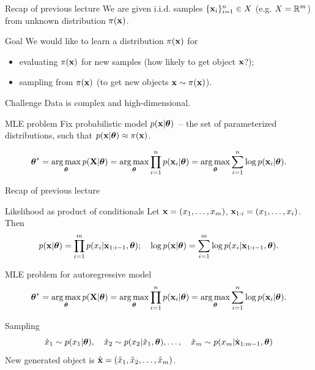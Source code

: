 

\begin{frame}
\titlepage
\end{frame}
\begin{frame}{Recap of previous lecture}
	We are given i.i.d. samples $\{\mathbf{x}_i\}_{i=1}^n \in X$ (e.g. $X = \mathbb{R}^m$) from unknown distribution $\pi(\mathbf{x})$.
	\begin{block}{Goal}
		We would like to learn a distribution $\pi(\mathbf{x})$ for 
		\begin{itemize}
			\item evaluating $\pi(\mathbf{x})$ for new samples (how likely to get object $\mathbf{x}$?);
			\item sampling from $\pi(\mathbf{x})$ (to get new objects $\mathbf{x} \sim \pi(\mathbf{x})$).
		\end{itemize}
	\end{block}
	\begin{block}{Challenge}
		Data is complex and high-dimensional.
	\end{block}
	\begin{block}{MLE problem}
	Fix probabilistic model $p(\mathbf{x} | \boldsymbol{\theta})$~-- the set of parameterized distributions, such that $p(\mathbf{x} | \boldsymbol{\theta}) \approx \pi(\mathbf{x})$.
	
		\vspace{-0.3cm}
		\[
		\boldsymbol{\theta}^* = \operatorname*{arg\,max}_{\boldsymbol{\theta}} p(\mathbf{X} | \boldsymbol{\theta}) = \operatorname*{arg\,max}_{\boldsymbol{\theta}} \prod_{i=1}^n p(\mathbf{x}_i | \boldsymbol{\theta}) = \operatorname*{arg\,max}_{\boldsymbol{\theta}} \sum_{i=1}^n \log p(\mathbf{x}_i | \boldsymbol{\theta}).
		\]
		\vspace{-0.1cm}
	\end{block}
\end{frame}
\begin{frame}{Recap of previous lecture}
	\begin{block}{Likelihood as product of conditionals}
		Let $\mathbf{x} = (x_1, \dots, x_m)$, $\mathbf{x}_{1:i} = (x_1, \dots, x_i)$. Then 
		\[
		p(\mathbf{x} | \boldsymbol{\theta}) = \prod_{i=1}^m p(x_i | \mathbf{x}_{1:i - 1}, \boldsymbol{\theta}); \quad 
		\log p(\mathbf{x} | \boldsymbol{\theta}) = \sum_{i=1}^m \log p(x_i | \mathbf{x}_{1:i - 1}, \boldsymbol{\theta}).
		\]
	\end{block}
	\vspace{-0.3cm}
	\begin{block}{MLE problem for autoregressive model}
		\vspace{-0.5cm}
		\[
		\boldsymbol{\theta}^* = \operatorname*{arg\,max}_{\boldsymbol{\theta}} p(\mathbf{X} | \boldsymbol{\theta}) = \operatorname*{arg\,max}_{\boldsymbol{\theta}} \prod_{i=1}^n p(\mathbf{x}_i | \boldsymbol{\theta}) = \operatorname*{arg\,max}_{\boldsymbol{\theta}} \sum_{i=1}^n \log p(\mathbf{x}_i | \boldsymbol{\theta}).
		\]
		\vspace{-0.5cm}
	\end{block}
	\begin{block}{Sampling}
		\vspace{-0.5cm}
		\[
			\hat{x}_1 \sim p(x_1 | \boldsymbol{\theta}), \quad \hat{x}_2 \sim p(x_2 | \hat{x}_1, \boldsymbol{\theta}), \dots, \quad \hat{x}_m \sim p(x_m | \hat{\mathbf{x}}_{1:m-1}, \boldsymbol{\theta})
		\]
		New generated object is $\hat{\mathbf{x}} = (\hat{x}_1, \hat{x}_2, \dots, \hat{x}_m)$.
	\end{block}
\end{frame}
